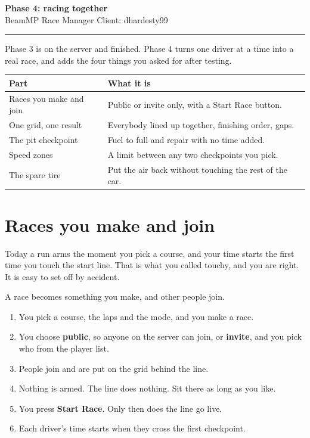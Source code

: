 \documentclass[11pt,a4paper]{article}
\begin{document}
\begin{center}
{\LARGE\bfseries Phase 4: racing together}\\[4pt]
{\small BeamMP Race Manager \quad Client: dhardesty99}
\end{center}

\vspace{4pt}
\hrule
\vspace{8pt}

Phase 3 is on the server and finished. Phase 4 turns one driver at a time into
a real race, and adds the four things you asked for after testing.

\begin{longtable}{@{}p{52mm}p{110mm}@{}}
\toprule
\textbf{Part} & \textbf{What it is} \\
\midrule
\endhead
Races you make and join & Public or invite only, with a Start Race button. \\
One grid, one result & Everybody lined up together, finishing order, gaps. \\
The pit checkpoint & Fuel to full and repair with no time added. \\
Speed zones & A limit between any two checkpoints you pick. \\
The spare tire & Put the air back without touching the rest of the car. \\
\bottomrule
\end{longtable}

\section{Races you make and join}

Today a run arms the moment you pick a course, and your time starts the first
time you touch the start line. That is what you called touchy, and you are
right. It is easy to set off by accident.

A race becomes something you make, and other people join.

\begin{enumerate}
  \item You pick a course, the laps and the mode, and you make a race.
  \item You choose \textbf{public}, so anyone on the server can join, or
        \textbf{invite}, and you pick who from the player list.
  \item People join and are put on the grid behind the line.
  \item Nothing is armed. The line does nothing. Sit there as long as you like.
  \item You press \textbf{Start Race}. Only then does the line go live.
  \item Each driver's time starts when they cross the first checkpoint.
\end{enumerate}
\end{document}
